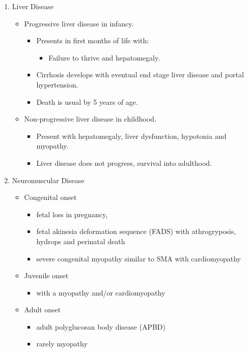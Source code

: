 \documentclass{scrartcl}
\begin{document}
\begin{enumerate}
\item Liver Disease
\label{sec:org3ab5e78}
\begin{itemize}
\item Progressive liver disease in infancy.
\begin{itemize}
\item Presents in first months of life with:
\begin{itemize}
\item Failure to thrive and hepatomegaly.
\end{itemize}
\item Cirrhosis develops with eventual end stage liver disease and
portal hypertension.
\item Death is usual by 5 years of age.
\end{itemize}
\item Non-progressive liver disease in childhood.
\begin{itemize}
\item Present with hepatomegaly, liver dysfunction, hypotonia and
myopathy.
\item Liver disease does not progress, survival into adulthood.
\end{itemize}
\end{itemize}

\item Neuromuscular Disease
\label{sec:org16814f7}
\begin{itemize}
\item Congenital onset
\begin{itemize}
\item fetal loss in pregnancy,
\item fetal akinesia deformation sequence (FADS) with athrogryposis, hydrops and perinatal death
\item severe congenital myopathy similar to SMA with \textpm{} cardiomyopathy
\end{itemize}
\item Juvenile onset
\begin{itemize}
\item with a myopathy and/or cardiomyopathy
\end{itemize}
\item Adult onset
\begin{itemize}
\item adult polyglucosan body disease (APBD)
\item rarely myopathy
\end{itemize}
\end{itemize}
\end{enumerate}
\end{document}
